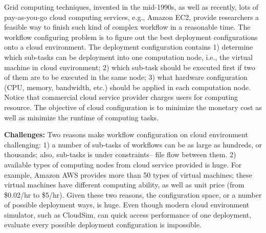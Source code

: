 \documentclass[table, xcdraw, sigconf,review, anonymous]{acmart}
\begin{document}
Grid computing techniques, invented in the mid-1990s, as well as recently, lots of pay-as-you-go cloud computing services, e.g., Amazon EC2, provide researchers a feasible way to finish such kind of complex workflow in a reasonable time.
The workflow configuring problem is to figure out the best deployment configurations onto a cloud environment. The deployment configuration
contains 1) determine which sub-tasks can be deployment into
one computation node, i.e., the virtual machine in cloud environment; 2) which sub-task should be executed first if two of them are to be executed in the same node; 3) what hardware configuration (CPU, memory, bandwidth, etc.) should be applied in each computation node. Notice that commercial cloud service provider charges users for computing resource. 
The objective of cloud configuration is to minimize the monetary cost as well as minimize the runtime of computing tasks.


\noindent\textbf{Challenges: } 
Two reasons make workflow configuration on cloud environment challenging: 1)  a number of sub-tasks of workflows can be as large as hundreds, or thousands; also, sub-tasks is under constraints-- file flow between them. 2) available types of
computing nodes from cloud service provided is huge.
For example, Amazon AWS provides more than 50 types of virtual machines; these
virtual machines have different computing ability, as well as unit price (from \$0.02/hr to \$5/hr).
Given these two reasons,
the configuration space, or a number of possible deployment ways, is huge.
Even though modern cloud environment simulator, such as CloudSim, can quick
access performance of one deployment, evaluate every
possible deployment configuration is impossible.
\end{document}
